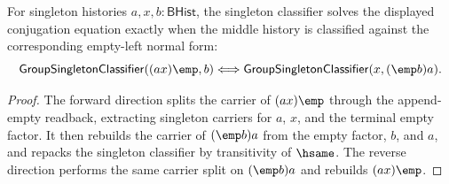 \begin{theorem}
\label{thm:group-singleton-conjugation-equation-solver}
For singleton histories $a,x,b:\mathsf{BHist}$, the singleton classifier
solves the displayed conjugation equation exactly when the middle history is
classified against the corresponding empty-left normal form:
$$
\mathsf{GroupSingletonClassifier}((a x)\emp,b)
\Longleftrightarrow
\mathsf{GroupSingletonClassifier}(x,(\emp b)a).
$$
\end{theorem}
\begin{proof}
The forward direction splits the carrier of $(a x)\emp$ through the append-empty
readback, extracting singleton carriers for $a$, $x$, and the terminal empty
factor. It then rebuilds the carrier of $(\emp b)a$ from the empty factor,
$b$, and $a$, and repacks the singleton classifier by transitivity of
$\hsame$. The reverse direction performs the same carrier split on
$(\emp b)a$ and rebuilds $(a x)\emp$.
\end{proof}

